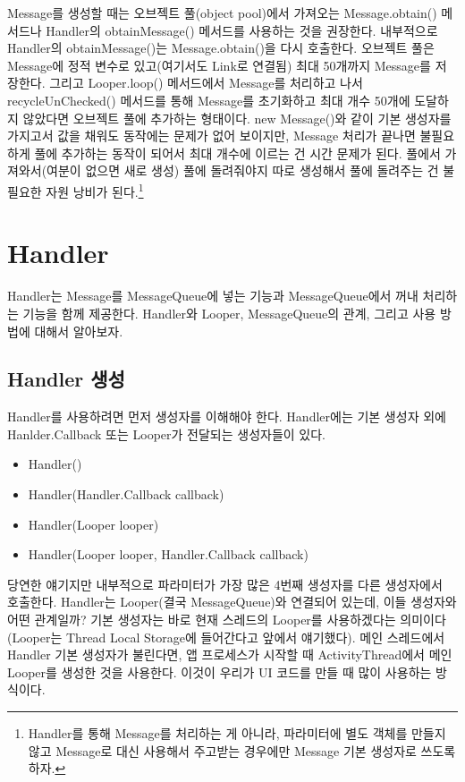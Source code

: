 Message를 생성할 때는 오브젝트 풀(object pool)에서 가져오는 Message.obtain() 메서드나 Handler의 obtainMessage() 메서드를 사용하는 것을 권장한다. 내부적으로 Handler의 obtainMessage()는  Message.obtain()을 다시 호출한다.
오브젝트 풀은 Message에 정적 변수로 있고(여기서도 Link로 연결됨) 최대 50개까지 Message를 저장한다. 그리고 Looper.loop() 메서드에서 Message를 처리하고 나서 recycleUnChecked() 메서드를 통해 Message를 초기화하고 최대 개수 50개에 도달하지 않았다면 오브젝트 풀에 추가하는 형태이다.
new Message()와 같이 기본 생성자를 가지고서 값을 채워도 동작에는 문제가 없어 보이지만, Message 처리가 끝나면 불필요하게 풀에 추가하는 동작이 되어서 최대 개수에 이르는 건 시간 문제가 된다. 
풀에서 가져와서(여분이 없으면 새로 생성) 풀에 돌려줘야지 따로 생성해서 풀에 돌려주는 건 불필요한 자원 낭비가 된다.\footnote{Handler를 통해 Message를 처리하는 게 아니라, 파라미터에 별도 객체를 만들지 않고 Message로 대신 사용해서 주고받는 경우에만 Message 기본 생성자로 쓰도록 하자.}\\


\section{Handler}
Handler는 Message를 MessageQueue에 넣는 기능과 MessageQueue에서 꺼내 처리하는 기능을 함께 제공한다. Handler와 Looper, MessageQueue의 관계, 그리고 사용 방법에 대해서 알아보자.

\subsection{Handler 생성}
Handler를 사용하려면 먼저 생성자를 이해해야 한다. 
Handler에는 기본 생성자 외에 Hanlder.Callback 또는 Looper가 전달되는 생성자들이 있다. 
\begin{itemize}
\item Handler()
\item Handler(Handler.Callback callback)
\item Handler(Looper looper)
\item Handler(Looper looper, Handler.Callback callback)
\end{itemize}
당연한 얘기지만 내부적으로 파라미터가 가장 많은 4번째 생성자를 다른 생성자에서 호출한다.
Handler는 Looper(결국 MessageQueue)와 연결되어 있는데, 이들 생성자와 어떤 관계일까? 
기본 생성자는 바로 현재 스레드의 Looper를 사용하겠다는 의미이다(Looper는 Thread Local Storage에 들어간다고 앞에서 얘기했다).
메인 스레드에서 Handler 기본 생성자가 불린다면, 앱 프로세스가 시작할 때 ActivityThread에서 메인 Looper를 생성한 것을 사용한다. 
이것이 우리가 UI 코드를 만들 때 많이 사용하는 방식이다.\\

